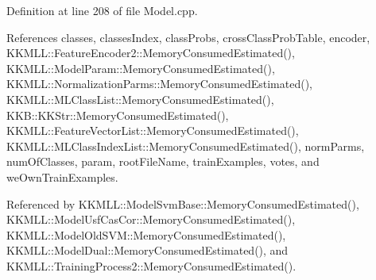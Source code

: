 Definition at line 208 of file Model.\+cpp.



References classes, classes\+Index, class\+Probs, cross\+Class\+Prob\+Table, encoder, K\+K\+M\+L\+L\+::\+Feature\+Encoder2\+::\+Memory\+Consumed\+Estimated(), K\+K\+M\+L\+L\+::\+Model\+Param\+::\+Memory\+Consumed\+Estimated(), K\+K\+M\+L\+L\+::\+Normalization\+Parms\+::\+Memory\+Consumed\+Estimated(), K\+K\+M\+L\+L\+::\+M\+L\+Class\+List\+::\+Memory\+Consumed\+Estimated(), K\+K\+B\+::\+K\+K\+Str\+::\+Memory\+Consumed\+Estimated(), K\+K\+M\+L\+L\+::\+Feature\+Vector\+List\+::\+Memory\+Consumed\+Estimated(), K\+K\+M\+L\+L\+::\+M\+L\+Class\+Index\+List\+::\+Memory\+Consumed\+Estimated(), norm\+Parms, num\+Of\+Classes, param, root\+File\+Name, train\+Examples, votes, and we\+Own\+Train\+Examples.



Referenced by K\+K\+M\+L\+L\+::\+Model\+Svm\+Base\+::\+Memory\+Consumed\+Estimated(), K\+K\+M\+L\+L\+::\+Model\+Usf\+Cas\+Cor\+::\+Memory\+Consumed\+Estimated(), K\+K\+M\+L\+L\+::\+Model\+Old\+S\+V\+M\+::\+Memory\+Consumed\+Estimated(), K\+K\+M\+L\+L\+::\+Model\+Dual\+::\+Memory\+Consumed\+Estimated(), and K\+K\+M\+L\+L\+::\+Training\+Process2\+::\+Memory\+Consumed\+Estimated().


